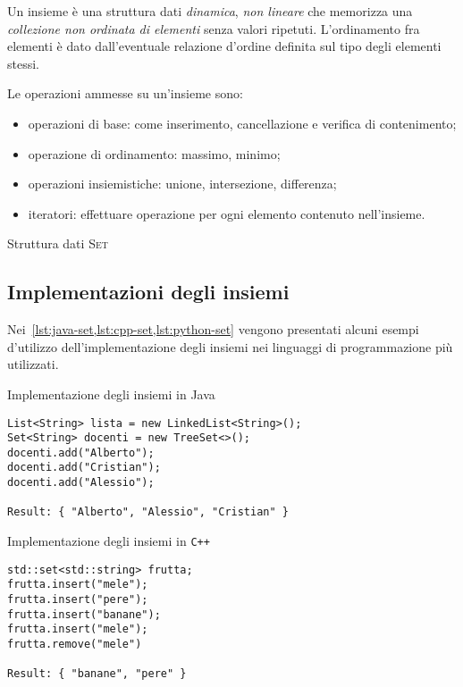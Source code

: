 Un insieme è una struttura dati \emph{dinamica}, \emph{non lineare} che memorizza una \emph{collezione non ordinata di elementi} senza valori ripetuti.
L'ordinamento fra elementi è dato dall'eventuale relazione d'ordine definita sul tipo degli elementi stessi.

Le operazioni ammesse su un'insieme sono:
\begin{itemize}
	\item operazioni di base: come inserimento, cancellazione e verifica di contenimento;
	\item operazione di ordinamento: massimo, minimo;
	\item operazioni insiemistiche: unione, intersezione, differenza;
	\item iteratori: effettuare operazione per ogni elemento contenuto nell'insieme.
\end{itemize}

\begin{algorithm}[H]
	\caption[Struttura dati insieme]{Struttura dati \textsc{Set}}
	
\end{algorithm}

\subsection{Implementazioni degli insiemi}

Nei~\cref{lst:java-set,lst:cpp-set,lst:python-set} vengono presentati alcuni esempi d'utilizzo dell'implementazione degli insiemi nei linguaggi di programmazione più utilizzati.

\begin{listing}[H]
\caption{Implementazione degli insiemi in Java}%
\label{lst:java-set}
\begin{verbatim}
List<String> lista = new LinkedList<String>();
Set<String> docenti = new TreeSet<>();
docenti.add("Alberto");
docenti.add("Cristian");
docenti.add("Alessio");

Result: { "Alberto", "Alessio", "Cristian" }
\end{verbatim}
\end{listing}
\vspace{-25pt}

\begin{listing}[H]
\caption{Implementazione degli insiemi in \texttt{C++}}%
\label{lst:cpp-set}
\begin{verbatim}
std::set<std::string> frutta;
frutta.insert("mele");
frutta.insert("pere");
frutta.insert("banane");
frutta.insert("mele");
frutta.remove("mele")

Result: { "banane", "pere" }
\end{verbatim}
\end{listing}
\vspace{-25pt}

